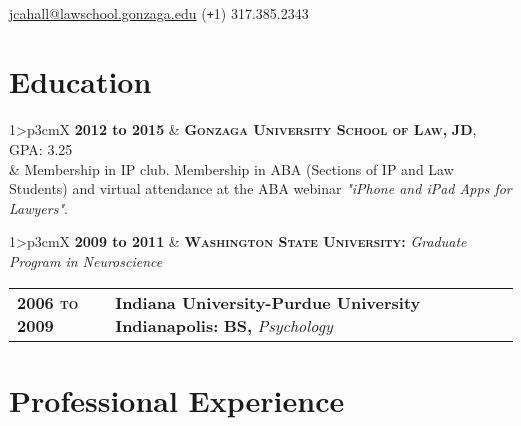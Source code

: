 \documentclass[letter, 12pt, oneside]{article}
\begin{document}

\begin{center}
\color{headings}\textsc{\Huge{}}\\ 

\color{text1}
{\Large\Letter} \href{mailto:email@address.com}{jcahall@lawschool.gonzaga.edu} 
\hfill {\Large\Mobilefone} (\texttt{+}1) 317.385.2343 \\




\section{Education}
\begin{tabularx}{1\linewidth}{>{\raggedleft\scshape}p{3cm}X}
\textbf{2012 to 2015} & \textsc{\textbf{Gonzaga University School of Law,}} \textbf{JD}, 
GPA: 3.25 \\ 
&  Membership in IP club. Membership in ABA (Sections of IP and Law Students) and virtual attendance at the ABA webinar \textit{"iPhone and iPad Apps for Lawyers"}.
\end{tabularx}

\begin{tabularx}{1\linewidth}{>{\raggedleft\scshape}p{3cm}X}
\textbf{2009 to 2011} & \textsc{\textbf{Washington State University:}} \textit{Graduate Program in Neuroscience}\\ 
\end{tabularx}

\begin{tabularx}{1\linewidth}{>{\raggedleft\scshape}p{3cm}X}
\textbf{2006 to 2009} & \textbf{Indiana University-Purdue University Indianapolis:} \textbf{BS,} \textit{Psychology}\\ 
\end{tabularx}



\section{Professional Experience}


\end{center}
\end{document}
